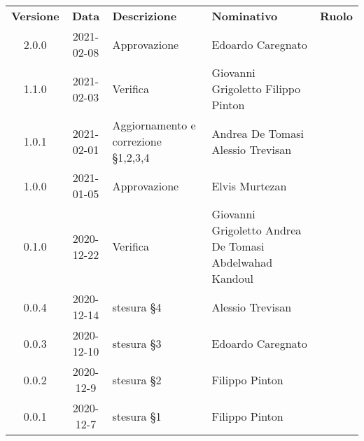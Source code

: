 {
\renewcommand{\arraystretch}{1.5}
\centering
\begin{longtable}{ c c  C{3.5cm}  C{4cm}  c }
    \rowcolor{\primaryColor}
    \textcolor{\secondaryColor}{
    \textbf{Versione}}     & \textcolor{\secondaryColor}{\textbf{Data}}       & \textcolor{\secondaryColor}
    {\textbf{Descrizione}} & \textcolor{\secondaryColor}{\textbf{Nominativo}} & \textcolor{\secondaryColor}{\textbf{Ruolo}}                                         \\


    2.0.0               & 2021-02-08                                        & Approvazione           & Edoardo Caregnato      & \responsabile{} \\
    1.1.0               & 2021-02-03                                        & Verifica		           & Giovanni Grigoletto \newline Filippo Pinton      & \verificatore{} \\
    1.0.1               & 2021-02-01                                        & Aggiornamento e correzione §1,2,3,4          & Andrea De Tomasi \newline Alessio Trevisan      & \amministratore{} \\
    1.0.0               & 2021-01-05                                        & Approvazione               & Elvis Murtezan      & \responsabile{} \\
    0.1.0               & 2020-12-22                                       & Verifica             & Giovanni Grigoletto \newline Andrea De Tomasi \newline Abdelwahad Kandoul  & \verificatore{} \\
    0.0.4               & 2020-12-14    & stesura §4 & Alessio Trevisan & \amministratore {} \\
    0.0.3               & 2020-12-10    & stesura §3 & Edoardo Caregnato & \amministratore {} \\
    0.0.2               & 2020-12-9    & stesura §2 & Filippo Pinton & \amministratore {} \\
    0.0.1               & 2020-12-7    & stesura §1 & Filippo Pinton & \amministratore {} \\



\end{longtable}
}